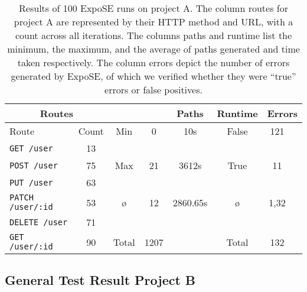 \begin{table}[ht]
	\begin{tabular*}{\linewidth}{@{\extracolsep{\fill}}lccccccc}
		\toprule \multicolumn{2}{c}{Routes}                                          &        &       & Paths & Runtime           & \multicolumn{2}{c}{Errors} \\
		\midrule Route                                                                 & Count & Min   & 0      & 10s                       & False & 121  \\
		\cmidrule(r){1-2}\cmidrule(lr){3-3}\cmidrule(lr){6-6} \lstinline+GET /user+    & 13    &       &         &                           &       &    \\
		\cmidrule(r){1-1} \lstinline+POST /user+                                       & 75    & Max   & 21      & 3612s                     & True  & 11 \\
		\cmidrule(r){1-1}\cmidrule(lr){3-3}\cmidrule(lr){6-6} \lstinline+PUT /user+    & 63     &       &         &                           &       &    \\
		\cmidrule(r){1-1} \lstinline+PATCH /user/:id+                                  & 53     & \o{}  & 12      & 2860.65s                     & \o{}   & 1,32 \\
		\cmidrule(r){1-1}\cmidrule(lr){3-3}\cmidrule(lr){6-6} \lstinline+DELETE /user+ & 71     &       &         &                           &        \\
		\cmidrule(r){1-1} \lstinline+GET /user/:id+                                    & 90    & Total &  1207     &                           & Total &  132  \\
		\cmidrule(r){1-1}\cmidrule(lr){3-3}\cmidrule(lr){6-6}

\bottomrule
	\end{tabular*}
	\caption[General results of project A]{ Results of 100 ExpoSE runs on project A.
	The column routes for project A are represented by their HTTP method and URL, with
	a count across all iterations. The columns paths and runtime list the minimum,
	the maximum, and the average of paths generated and time taken respectively. The
	column errors depict the number of errors generated by ExpoSE, of which we
	verified whether they were “true” errors or false positives. }
	\label{tab:results-project-one}
\end{table}

\FloatBarrier
\subsection{General Test Result Project B}

